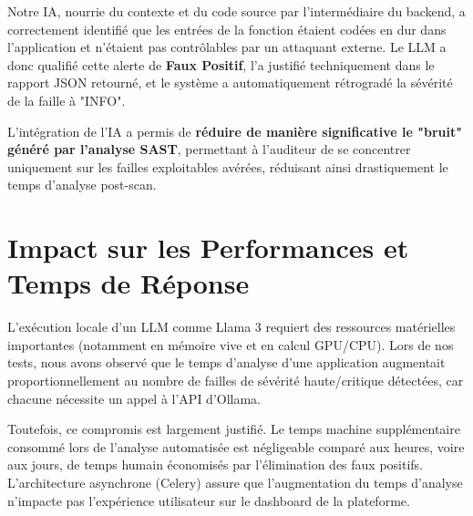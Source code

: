 Notre IA, nourrie du contexte et du code source par l'intermédiaire du backend, a correctement identifié que les entrées de la fonction  étaient codées en dur dans l'application et n'étaient pas contrôlables par un attaquant externe. Le LLM a donc qualifié cette alerte de \textbf{Faux Positif}, l'a justifié techniquement dans le rapport JSON retourné, et le système a automatiquement rétrogradé la sévérité de la faille à "INFO".

\begin{tcolorbox}[successbox, title={Résultat du Triage IA}]
L'intégration de l'IA a permis de \textbf{réduire de manière significative le "bruit" généré par l'analyse SAST}, permettant à l'auditeur de se concentrer uniquement sur les failles exploitables avérées, réduisant ainsi drastiquement le temps d'analyse post-scan.
\end{tcolorbox}

\section{Impact sur les Performances et Temps de Réponse}
L'exécution locale d'un LLM comme Llama 3 requiert des ressources matérielles importantes (notamment en mémoire vive et en calcul GPU/CPU). Lors de nos tests, nous avons observé que le temps d'analyse d'une application augmentait proportionnellement au nombre de failles de sévérité haute/critique détectées, car chacune nécessite un appel à l'API d'Ollama.

Toutefois, ce compromis est largement justifié. Le temps machine supplémentaire consommé lors de l'analyse automatisée est négligeable comparé aux heures, voire aux jours, de temps humain économisés par l'élimination des faux positifs. L'architecture asynchrone (Celery) assure que l'augmentation du temps d'analyse n'impacte pas l'expérience utilisateur sur le dashboard de la plateforme.

\cleardoublepage
